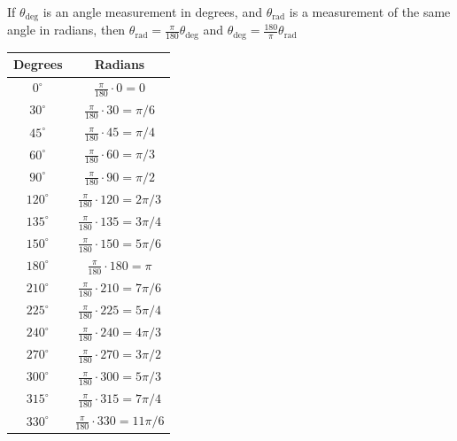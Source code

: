 \documentclass{article}
\begin{document}
If \(\theta_{\text{deg}}\) is an angle measurement in degrees, and \(\theta_{\text{rad}}\) is a measurement of the same angle in radians, then \(\theta_{\text{rad}} = \frac{\pi}{180}\theta_{\text{deg}}\) and \(\theta_{\text{deg}} = \frac{180}{\pi}\theta_{\text{rad}}\)

\begin{tabular}{|c|c|}
\hline
Degrees & Radians \\
\hline
\hline
\(0^\circ\) & \(\frac{\pi}{180} \cdot 0 = 0\) \\
\hline
\(30^\circ\) & \(\frac{\pi}{180} \cdot 30 = \pi/6\) \\
\hline
\(45^\circ\) & \(\frac{\pi}{180} \cdot 45 = \pi/4\) \\
\hline
\(60^\circ\) & \(\frac{\pi}{180} \cdot 60 = \pi/3\) \\
\hline
\(90^\circ\) & \(\frac{\pi}{180} \cdot 90 = \pi/2\) \\
\hline
\(120^\circ\) & \(\frac{\pi}{180} \cdot 120 = 2\pi/3\) \\
\hline
\(135^\circ\) & \(\frac{\pi}{180} \cdot 135 = 3\pi/4\) \\
\hline
\(150^\circ\) & \(\frac{\pi}{180} \cdot 150 = 5\pi/6\) \\
\hline
\(180^\circ\) & \(\frac{\pi}{180} \cdot 180 = \pi\) \\
\hline
\(210^\circ\) & \(\frac{\pi}{180} \cdot 210 = 7\pi/6\) \\
\hline
\(225^\circ\) & \(\frac{\pi}{180} \cdot 225 = 5\pi/4\) \\
\hline
\(240^\circ\) & \(\frac{\pi}{180} \cdot 240 = 4\pi/3\) \\
\hline
\(270^\circ\) & \(\frac{\pi}{180} \cdot 270 = 3\pi/2\) \\
\hline
\(300^\circ\) & \(\frac{\pi}{180} \cdot 300 = 5\pi/3\) \\
\hline
\(315^\circ\) & \(\frac{\pi}{180} \cdot 315 = 7\pi/4\) \\
\hline
\(330^\circ\) & \(\frac{\pi}{180} \cdot 330 = 11\pi/6\) \\
\hline
\end{tabular}
\end{document}
